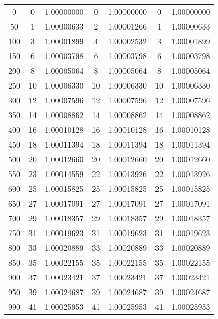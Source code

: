 \begin{table}
\begin{tabular}{S[table-format = 3.0] | S[table-format = 2.0] S | S[table-format = 2.0] S | S[table-format = 2.0] S}
            &  0   &   1.00000000  &  0   & 1.00000000  & 0   &  1.00000000  \\
        50   &  1   &   1.00000633  &  2   & 1.00001266  & 1   &  1.00000633  \\
        100  &  3   &   1.00001899  &  4   & 1.00002532  & 3   &  1.00001899  \\
        150  &  6   &   1.00003798  &  6   & 1.00003798  & 6   &  1.00003798  \\
        200  &  8   &   1.00005064  &  8   & 1.00005064  & 8   &  1.00005064  \\
        250  &  10  &   1.00006330  &  10  & 1.00006330  & 10  &  1.00006330  \\
        300  &  12  &   1.00007596  &  12  & 1.00007596  & 12  &  1.00007596  \\
        350  &  14  &   1.00008862  &  14  & 1.00008862  & 14  &  1.00008862  \\
        400  &  16  &   1.00010128  &  16  & 1.00010128  & 16  &  1.00010128  \\
        450  &  18  &   1.00011394  &  18  & 1.00011394  & 18  &  1.00011394  \\
        500  &  20  &   1.00012660  &  20  & 1.00012660  & 20  &  1.00012660  \\
        550  &  23  &   1.00014559  &  22  & 1.00013926  & 22  &  1.00013926  \\
        600  &  25  &   1.00015825  &  25  & 1.00015825  & 25  &  1.00015825  \\
        650  &  27  &   1.00017091  &  27  & 1.00017091  & 27  &  1.00017091  \\
        700  &  29  &   1.00018357  &  29  & 1.00018357  & 29  &  1.00018357  \\
        750  &  31  &   1.00019623  &  31  & 1.00019623  & 31  &  1.00019623  \\
        800  &  33  &   1.00020889  &  33  & 1.00020889  & 33  &  1.00020889  \\
        850  &  35  &   1.00022155  &  35  & 1.00022155  & 35  &  1.00022155  \\
        900  &  37  &   1.00023421  &  37  & 1.00023421  & 37  &  1.00023421  \\
        950  &  39  &   1.00024687  &  39  & 1.00024687  & 39  &  1.00024687  \\
        990  &  41  &   1.00025953  &  41  & 1.00025953  & 41  &  1.00025953  \\

        \bottomrule

    \end{tabular}
\end{table}

